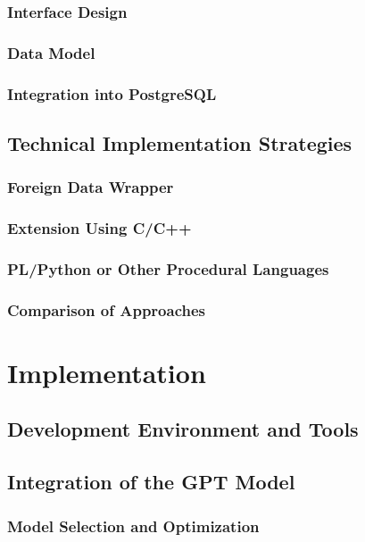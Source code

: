 \documentclass{article}
\begin{document}
\subsubsection{Interface Design}
\subsubsection{Data Model}
\subsubsection{Integration into PostgreSQL}

\subsection{Technical Implementation Strategies}
\subsubsection{Foreign Data Wrapper}
\subsubsection{Extension Using C/C++}
\subsubsection{PL/Python or Other Procedural Languages}
\subsubsection{Comparison of Approaches}

\newpage

\section{Implementation}

\subsection{Development Environment and Tools}

\subsection{Integration of the GPT Model}
\subsubsection{Model Selection and Optimization}
\end{document}
